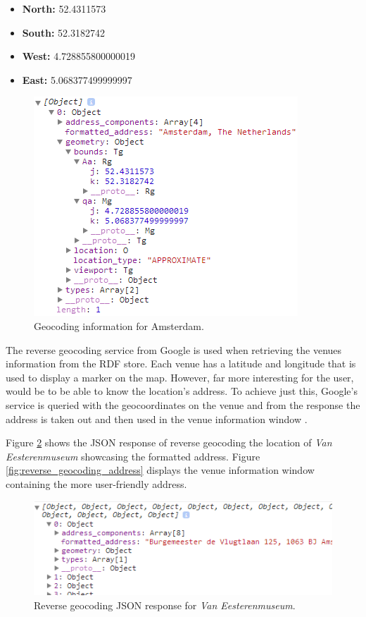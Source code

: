 \documentclass[hidelinks,a4paper]{article}
\begin{document}
\begin{itemize}
  \item \textbf{North:} 52.4311573
  \item \textbf{South:} 52.3182742
  \item \textbf{West:} 4.728855800000019
  \item \textbf{East:} 5.068377499999997
\end{itemize}

\begin{figure}[h!]
  \centering
    \includegraphics[]{images/geocode_amsterdam.png}    
    \caption{Geocoding information for Amsterdam.}
    \label{fig:geocoding_amsterdam}
\end{figure}

The reverse geocoding service from Google \cite{reverse_geocoding} is used when retrieving the venues information from the RDF store. Each venue has a latitude and longitude that is used to display a marker on the map. However, far more interesting for the user, would be to be able to know the location's address. To achieve just this, Google's service is queried with the geocoordinates on the venue and from the response  the address is taken out and then used in the venue information window .

Figure \ref{fig:reverse_geo_response} shows the JSON response of reverse geocoding the location of \emph{Van Eesterenmuseum} showcasing the formatted address. Figure \ref{fig:reverse_geocoding_address} displays the venue information window containing the more user-friendly address.

\begin{figure}[h!]
  \centering
    \includegraphics[]{images/geocode_find_address_response.png}    
    \caption{Reverse geocoding JSON response for \emph{Van Eesterenmuseum}.}
    \label{fig:reverse_geo_response}
\end{figure}
\end{document}

